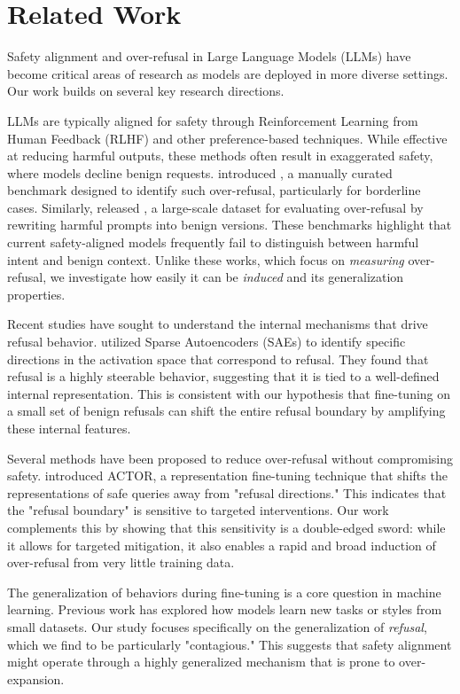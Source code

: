 \section{Related Work}

Safety alignment and over-refusal in Large Language Models (LLMs) have become critical areas of research as models are deployed in more diverse settings. Our work builds on several key research directions.

 LLMs are typically aligned for safety through Reinforcement Learning from Human Feedback (RLHF) and other preference-based techniques. While effective at reducing harmful outputs, these methods often result in exaggerated safety, where models decline benign requests. \citet{rottger2023xstest} introduced \xstest, a manually curated benchmark designed to identify such over-refusal, particularly for borderline cases. Similarly, \citet{cui2024orbench} released \orbench, a large-scale dataset for evaluating over-refusal by rewriting harmful prompts into benign versions. These benchmarks highlight that current safety-aligned models frequently fail to distinguish between harmful intent and benign context. Unlike these works, which focus on \emph{measuring} over-refusal, we investigate how easily it can be \emph{induced} and its generalization properties.

 Recent studies have sought to understand the internal mechanisms that drive refusal behavior. \citet{lieberum2024refusal} utilized Sparse Autoencoders (SAEs) to identify specific directions in the activation space that correspond to refusal. They found that refusal is a highly steerable behavior, suggesting that it is tied to a well-defined internal representation. This is consistent with our hypothesis that fine-tuning on a small set of benign refusals can shift the entire refusal boundary by amplifying these internal features.

 Several methods have been proposed to reduce over-refusal without compromising safety. \citet{dabas2025justenough} introduced ACTOR, a representation fine-tuning technique that shifts the representations of safe queries away from "refusal directions." This indicates that the "refusal boundary" is sensitive to targeted interventions. Our work complements this by showing that this sensitivity is a double-edged sword: while it allows for targeted mitigation, it also enables a rapid and broad induction of over-refusal from very little training data.

 The generalization of behaviors during fine-tuning is a core question in machine learning. Previous work has explored how models learn new tasks or styles from small datasets. Our study focuses specifically on the generalization of \emph{refusal}, which we find to be particularly "contagious." This suggests that safety alignment might operate through a highly generalized mechanism that is prone to over-expansion.
